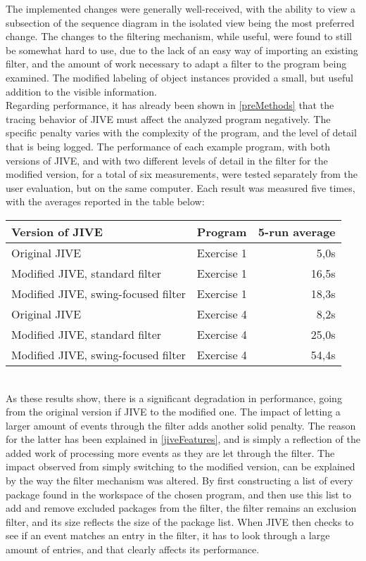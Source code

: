 The implemented changes were generally well-received, with the ability to view a subsection of the sequence diagram in the isolated view being the most preferred change.
The changes to the filtering mechanism, while useful, were found to still be somewhat hard to use, due to the lack of an easy way of importing an existing filter, and the amount of work necessary to adapt a filter to the program being examined.
The modified labeling of object instances provided a small, but useful addition to the visible information.
~\\

Regarding performance, it has already been shown in \autoref{preMethods} that the tracing behavior of JIVE must affect the analyzed program negatively.
The specific penalty varies with the complexity of the program, and the level of detail that is being logged.
The performance of each example program, with both versions of JIVE, and with two different levels of detail in the filter for the modified version, for a total of six measurements, were tested separately from the user evaluation, but on the same computer.
Each result was measured five times, with the averages reported in the table below:
~\\

\begin{center}
	\begin{tabular}{|l|l|r|}
		\hline
		Version of JIVE & Program & 5-run average\\ \hline
		Original JIVE & Exercise 1 & 5,0s\\ \hline	
		Modified JIVE, standard filter & Exercise 1 & 16,5s\\ \hline	
		Modified JIVE, swing-focused filter & Exercise 1 & 18,3s\\ \hline
		Original JIVE & Exercise 4 & 8,2s\\ \hline	
		Modified JIVE, standard filter & Exercise 4 & 25,0s\\ \hline	
		Modified JIVE, swing-focused filter & Exercise 4 & 54,4s\\ \hline
	\end{tabular}
\end{center}
~\\

As these results show, there is a significant degradation in performance, going from the original version if JIVE to the modified one.
The impact of letting a larger amount of events through the filter adds another solid penalty.
The reason for the latter has been explained in \autoref{jiveFeatures}, and is simply a reflection of the added work of processing more events as they are let through the filter.
The impact observed from simply switching to the modified version, can be explained by the way the filter mechanism was altered.
By first constructing a list of every package found in the workspace of the chosen program, and then use this list to add and remove excluded packages from the filter, the filter remains an exclusion filter, and its size reflects the size of the package list.
When JIVE then checks to see if an event matches an entry in the filter, it has to look through a large amount of entries, and that clearly affects its performance.
~\\

